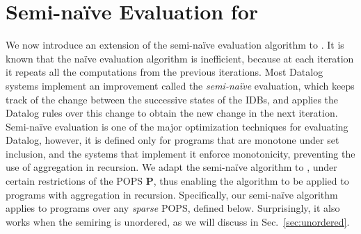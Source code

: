 
\section{Semi-na\"ive Evaluation for \datalogo}
\label{sec:semi-naive}

We now introduce an extension of the semi-na\"ive evaluation
algorithm to \datalogo.  It is known that the na\"ive evaluation
algorithm is inefficient, because at each iteration it
repeats all the computations from the previous
iterations.  Most Datalog systems implement an improvement called the
{\em semi-na\"ive} evaluation, which keeps track of the change between
the successive states of the IDBs, and applies the Datalog rules 
over this change to obtain the new change in the next iteration.
Semi-na\"ive evaluation is one of the major optimization techniques
for evaluating Datalog, however, it is defined only for programs that
are monotone under set inclusion, and the systems that implement it
enforce monotonicity, preventing the use of aggregation in
recursion. We adapt the
semi-na\"ive algorithm to \datalogo, under certain restrictions of the
POPS $\bm P$, thus enabling the algorithm to be applied
to programs with aggregation in recursion.
Specifically, our semi-na\"ive algorithm applies to \datalogo programs
 over any {\em sparse} POPS, defined below.
Surprisingly, it also works when the semiring is unordered, 
 as we will discuss in Sec.~\ref{sec:unordered}.

